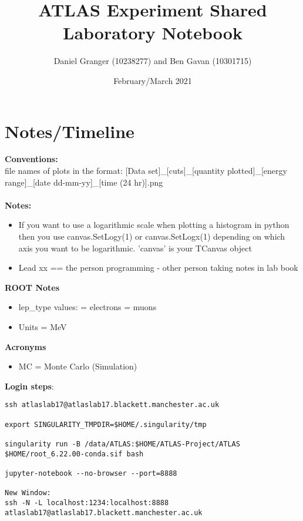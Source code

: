 \documentclass{article}
\title{\textbf{ATLAS Experiment Shared Laboratory Notebook}}
\author{Daniel Granger (10238277) and Ben Gavan (10301715)}
\date{February/March 2021}
\begin{document}
\maketitle


\section{Notes/Timeline}
\textbf{Conventions:}\\
file names of plots in the format: [Data set]\_[cuts]\_[quantity plotted]\_[energy range]\_[date dd-mm-yy]\_[time (24 hr)].png
\\\\
\textbf{Notes:}
\begin{itemize}
    \item If you want to use a logarithmic scale when plotting a histogram in python then you use canvas.SetLogy(1) or canvas.SetLogx(1) depending on which axis you want to be logarithmic. 'canvas' is your TCanvas object
    
    \item Lead xx == the person programming - other person taking notes in lab book
\end{itemize}
\textbf{ROOT Notes}
\begin{itemize}
    \item lep\_type values:
     = electrons 
     = muons
    
    \item Units = MeV
\end{itemize}
\textbf{Acronyms}
\begin{itemize}
    \item MC = Monte Carlo (Simulation)
\end{itemize}

\textbf{Login steps}:
\begin{lstlisting}
ssh atlaslab17@atlaslab17.blackett.manchester.ac.uk

export SINGULARITY_TMPDIR=$HOME/.singularity/tmp

singularity run -B /data/ATLAS:$HOME/ATLAS-Project/ATLAS $HOME/root_6.22.00-conda.sif bash

jupyter-notebook --no-browser --port=8888

New Window:
ssh -N -L localhost:1234:localhost:8888 atlaslab17@atlaslab17.blackett.manchester.ac.uk
\end{lstlisting}

\end{document}
